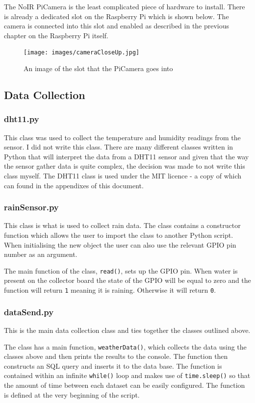 \documentclass[10pt,a4paper]{article}
\begin{document}
The NoIR PiCamera is the least complicated piece of hardware to install. There is already a dedicated slot on the Raspberry Pi which is shown below. The camera is connected into this slot and enabled as described in the previous chapter on the Raspberry Pi itself. 

\begin{figure}[H]
  \centering
    \texttt{[image: images/cameraCloseUp.jpg]}
    \caption{An image of the slot that the PiCamera goes into}
    \label{fig:piCamCloseUp}
\end{figure}

\subsection{Data Collection}
\subsubsection{dht11.py}
This class was used to collect the temperature and humidity readings from the sensor. I did not write this class. There are many different classes written in Python that will interpret the data from a DHT11 sensor and given that the way the sensor gather data is quite complex, the decision was made to not write this class myself. The DHT11 class is used under the MIT licence - a copy of which can found in the appendixes of this document. 

\subsubsection{rainSensor.py}
This class is what is used to collect rain data. The class contains a constructor function which allows the user to import the class to another Python script. When initialising the new object the user can also use the relevant GPIO pin number as an argument. 

The main function of the class, \texttt{read()}, sets up the GPIO pin. When water is present on the collector board the state of the GPIO will be equal to zero and the function will return \texttt{1} meaning it is raining. Otherwise it will return \texttt{0}. 

\subsubsection{dataSend.py}
This is the main data collection class and ties together the classes outlined above. 

The class has a main function, \texttt{weatherData()}, which collects the data using the classes above and then prints the results to the console. The function then constructs an SQL query and inserts it to the data base. The function is contained within an infinite \texttt{while()} loop and makes use of  \texttt{time.sleep()} so that the amount of time between each dataset can be easily configured. The function is defined at the very beginning of the script. 
\end{document}
